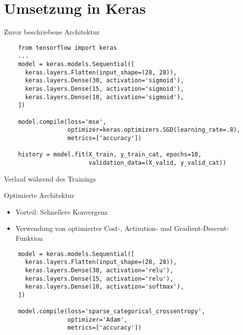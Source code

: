\section{Umsetzung in Keras}

\begin{frame}[fragile]{Zuvor beschriebene Architektur}
  \begin{lstlisting}
    from tensorflow import keras
    ...
    model = keras.models.Sequential([
      keras.layers.Flatten(input_shape=(28, 28)),
      keras.layers.Dense(30, activation='sigmoid'),
      keras.layers.Dense(15, activation='sigmoid'),
      keras.layers.Dense(10, activation='sigmoid'),
    ])

    model.compile(loss='mse',
                  optimizer=keras.optimizers.SGD(learning_rate=.8),
                  metrics=['accuracy'])

    history = model.fit(X_train, y_train_cat, epochs=10,
                        validation_data=(X_valid, y_valid_cat))
  \end{lstlisting}
\end{frame}

\begin{frame}{Verlauf während des Trainings}
  \begin{center}
  \end{center}
\end{frame}

\begin{frame}[fragile]{Optimierte Architektur}
  \begin{itemize}
  \item Vorteil: Schnellere Konvergenz
  \item Verwendung von optimierter Cost-, Activation- und Gradient-Descent-Funktion
  \end{itemize}
  \begin{lstlisting}
    model = keras.models.Sequential([
      keras.layers.Flatten(input_shape=(28, 28)),
      keras.layers.Dense(30, activation='relu'),
      keras.layers.Dense(15, activation='relu'),
      keras.layers.Dense(10, activation='softmax'),
    ])

    model.compile(loss='sparse_categorical_crossentropy',
                  optimizer='Adam',
                  metrics=['accuracy'])
  \end{lstlisting}
\end{frame}

